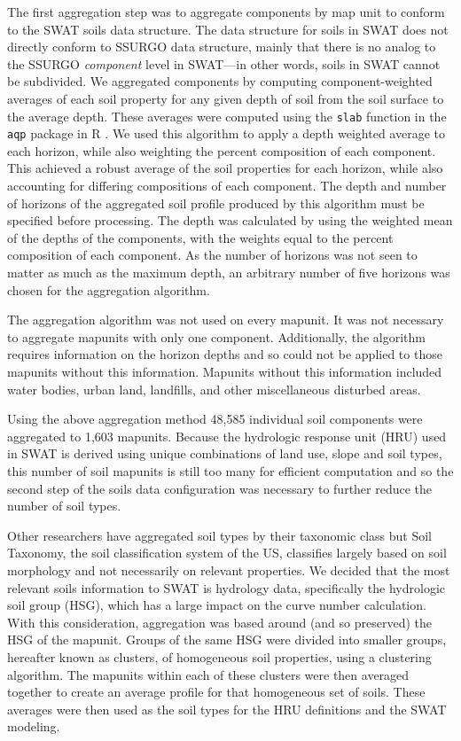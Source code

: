 The first aggregation step was to aggregate components by map unit to conform to
the SWAT soils data structure. The data structure for soils in SWAT does not
directly conform to SSURGO data structure, mainly that there is no analog to the
SSURGO \textit{component} level in SWAT---in other words, soils in SWAT cannot
be subdivided. We aggregated components by computing
component-weighted averages of each soil property for any given depth of soil from the soil surface to the average depth\cite{gatzke_aggregation_2011, beaudette_algorithms_2013}.
These averages were computed using the \texttt{slab} function in the \texttt{aqp} package in R \cite{beaudette_algorithms_2013}. We
used this algorithm to apply a depth weighted average to each horizon, while
also weighting the percent composition of each component. This achieved a robust
average of the soil properties for each horizon, while also accounting for
differing compositions of each component. The depth and number of horizons of
the aggregated soil profile produced by this algorithm must be specified before
processing. The depth was calculated by using the weighted mean of the depths of
the components, with the weights equal to the percent composition of each
component. As the number of horizons was not seen to matter as much as the
maximum depth, an arbitrary number of five horizons was chosen for the
aggregation algorithm.

The aggregation algorithm was not used on every mapunit. It was not necessary to
aggregate mapunits with only one component. Additionally, the algorithm requires
information on the horizon depths and so could not be applied to those mapunits
without this information. Mapunits without this information included water
bodies, urban land, landfills, and other miscellaneous disturbed areas.

Using the above aggregation method 48,585 individual soil components were
aggregated to 1,603 mapunits. Because the hydrologic response unit (HRU) used in
SWAT is derived using unique combinations of land use, slope and soil types,
this number of soil mapunits is still too many for efficient computation  and so
the second step of the soils data configuration was necessary to further reduce
the number of soil types. %

Other researchers have aggregated soil types by their taxonomic class
\citep{gatzke_aggregation_2011} but Soil Taxonomy, the soil classification
system of the US, classifies largely based on soil morphology and not
necessarily on relevant properties. We decided that the most relevant soils
information to SWAT is hydrology data, specifically the hydrologic soil group
(HSG), which has a large impact on the curve number calculation. With this
consideration, aggregation was based around (and so preserved) the HSG of the
mapunit. Groups of the same HSG were divided into smaller groups, hereafter
known as clusters, of homogeneous soil properties, using a clustering algorithm.
The mapunits within each of these clusters were then averaged together to create
an average profile for that homogeneous set of soils. These averages were then
used as the soil types for the HRU definitions and the SWAT modeling.

